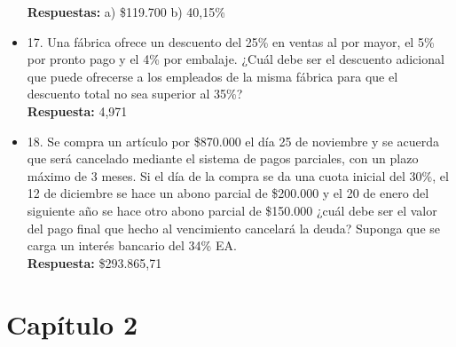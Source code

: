 \begin{itemize}
	\textbf{Respuestas:} a) \$119.700 b) 40,15\%
	
	\item 17. Una fábrica ofrece un descuento del 25\% en ventas al por mayor, el 5\% por pronto pago y el 4\% por embalaje. ¿Cuál debe ser el descuento adicional que puede ofrecerse a los empleados de la misma fábrica para que el descuento total no sea superior al 35\%?\\
	\textbf{Respuesta:} 4,971%
	
	\item 18. Se compra un artículo por \$870.000 el día 25 de noviembre y se acuerda que será cancelado mediante el sistema de pagos parciales, con un plazo máximo de 3 meses. Si el día de la compra se da una cuota inicial del 30\%, el 12 de diciembre se hace un abono parcial de \$200.000 y el 20 de enero del siguiente año se hace otro abono parcial de \$150.000 ¿cuál debe ser el valor del pago final que hecho al vencimiento cancelará la deuda? Suponga que se carga un interés bancario del 34\% EA.\\
	
	\textbf{Respuesta:} \$293.865,71
	
\end{itemize}

\chapter*{Capítulo 2}


